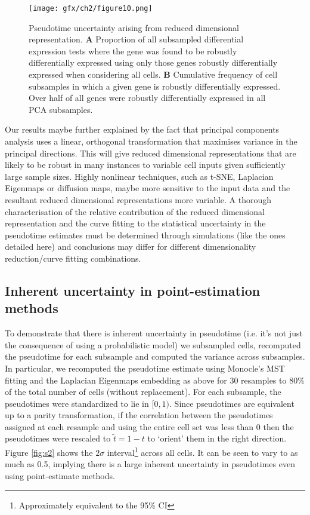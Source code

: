 \begin{figure}
\centering
	\texttt{[image: gfx/ch2/figure10.png]}
\caption[Pseudotime uncertainty arising from reduced dimensional representation.]{ Pseudotime uncertainty arising from reduced dimensional representation.
\textbf{A} Proportion of all subsampled differential expression tests where the gene was found to be robustly differentially expressed using only those genes robustly differentially expressed when considering all cells. %
\textbf{B} Cumulative frequency of cell subsamples in which a given gene is robustly differentially expressed. Over half of all genes were robustly differentially expressed in all PCA subsamples.} \label{fig:pca_compare}
\end{figure}

Our results maybe further explained by the fact that principal components analysis uses a linear, orthogonal transformation that maximises variance in the principal directions. This will give reduced dimensional representations that are likely to be robust in many instances to variable cell inputs given sufficiently large sample sizes. Highly nonlinear techniques, such as t-SNE, Laplacian Eigenmaps or diffusion maps, maybe more sensitive to the input data and the resultant reduced dimensional representations more variable. A thorough characterisation of the relative contribution of the reduced dimensional representation and the curve fitting to the statistical uncertainty in the pseudotime estimates must be determined through simulations (like the ones detailed here) and conclusions may differ for different dimensionality reduction/curve fitting combinations.

\subsection{Inherent uncertainty in point-estimation methods} \label{sec:inherentuncert}

To demonstrate that there is inherent uncertainty in pseudotime (i.e. it's not just the consequence of using a probabilistic model) we subsampled cells, recomputed the pseudotime for each subsample and computed the variance across subsamples. In particular, we recomputed the pseudotime estimate using Monocle's MST fitting and the Laplacian Eigenmaps embedding as above for 30 resamples to 80\% of the total number of cells (without replacement). For each subsample, the pseudotimes were standardized to lie in $[0,1)$. Since pseudotimes are equivalent up to a parity transformation, if the correlation between the pseudotimes assigned at each resample and using the entire cell set was less than 0 then the pseudotimes were rescaled to $\tilde{t} = 1-t$ to `orient' them in the right direction. Figure \ref{fig:s2} shows the $2\sigma$ interval\footnote{Approximately equivalent to the 95\% CI} across all cells. It can be seen to vary to as much as 0.5, implying there is a large inherent uncertainty in pseudotimes even using point-estimate methods.

